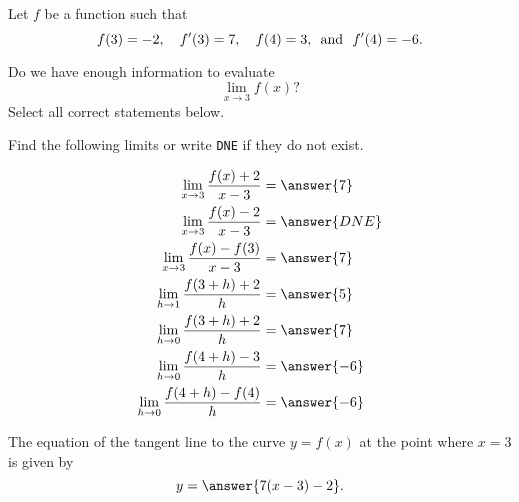 \documentclass{ximera}
\author{Nela Lakos \and Kyle Parsons}
\begin{document}
\begin{exercise}

Let $f$ be a function such that 
\[
f(3)=-2,\quad f'(3)=7,\quad f(4)=3\text{, \phantom{} and \phantom{} } f'(4)=-6.
\]

Do we have enough information to evaluate
\[
\lim_{x\to3}f(x)?
\]
Select all correct statements below.

\begin{selectAll}
\end{selectAll}

\begin{exercise}

Find the following limits or write \verb|DNE| if they do not exist.

\begin{align*}
\lim_{x\to3}\frac{f(x) + 2}{x - 3} &= \answer{7}\\
\lim_{x\to3}\frac{f(x) - 2}{x - 3} &= \answer{DNE}\\
\lim_{x\to3}\frac{f(x) - f(3)}{x-3} &= \answer{7}\\
\lim_{h\to1}\frac{f(3+h) + 2}{h} &= \answer{5}\\
\lim_{h\to0}\frac{f(3+h) + 2}{h} &= \answer{7}\\
\lim_{h\to0}\frac{f(4+h) - 3}{h} &= \answer{-6}\\
\lim_{h\to0}\frac{f(4+h) - f(4)}{h} &= \answer{-6}
\end{align*}

\begin{exercise}

The equation of the tangent line to the curve $y = f(x)$ at the point where $x = 3$ is given by
\[
y = \answer{7(x-3) - 2}.
\]

\end{exercise}
\end{exercise}
\end{exercise}
\end{document}
